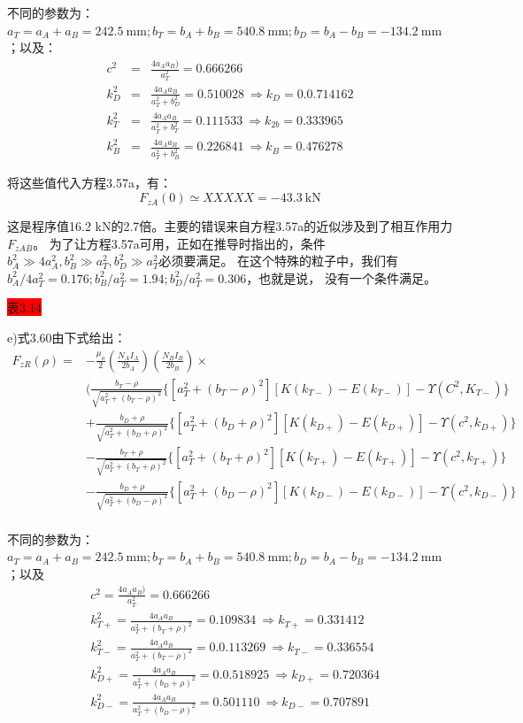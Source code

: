 不同的参数为：$a_T=a_A+a_B=242.5 \ \mathrm{mm};b_T=b_A+b_B=540.8 \ \mathrm{mm}; b_D=b_A−b_B=−134.2 \ \mathrm{mm}$；以及：
\begin{eqnarray*}
c^2&=&\frac{4a_A a_B)}{a_T^2}=0.666266\\
k_D^2&=&\frac{4a_A a_B}{a_T^2+b_D^2}=0.510028\ \Rightarrow k_D=0.0.714162\\
k_{T}^2&=&\frac{4a_A a_B}{a_T^2+b_T^2}=0.111533\ \Rightarrow k_{2b}=0.333965\\
k_B^2&=&\frac{4a_A a_B}{a_T^2+b_B^2}=0.226841\ \Rightarrow k_{B}=0.476278
\end{eqnarray*}

将这些值代入方程3.57a，有：
\begin{equation*}
F_{zA}(0)\simeq XXXXX =-43.3\ \mathrm{kN}
\end{equation*}

这是程序值16.2 kN的2.7倍。主要的错误来自方程3.57a的近似涉及到了相互作用力$F_{zAB}$。
为了让方程3.57a可用，正如在推导时指出的，条件$b_A^2\gg  4a_A^2,b^2_B\gg  a_T^2, b_D^2\gg a_T^2$必须要满足。
在这个特殊的粒子中，我们有$b_A^2/4a_T^2=0.176;b^2_B/a_T^2 = 1.94; b_D^2/a_T^2 = 0.306$，也就是说，
没有一个条件满足。

\colorbox{red}{表3.14}

e)式3.60由下式给出：
\begin{equation*}
\begin{split}
F_{zR}(\rho)=&-\frac{\mu_{o}}{2}(\frac{N_{A}I_{A}}{2b_{A}})(\frac{N_{B}I_{B}}{2b_{B}})\times\\
&(\frac{b_{T}-\rho}{\sqrt{a_{T}^{2}+(b_{T}-\rho)^{2}}}\{[a_{T}^{2}+(b_{T}-\rho)^{2}][K(k_{T-})-E(k_{T-})]-\Upsilon(C^{2},K_{T-})\}\\
&+\frac{b_{D}+\rho}{\sqrt{a_{T}^{2}+(b_{D}+\rho)^{2}}}\{[a_{T}^{2}+(b_{D}+\rho)^{2}][K(k_{D+})-E(k_{D+})]-\Upsilon(c^{2},k_{D+})\}\\
&-\frac{b_{T}+\rho}{\sqrt{a_{T}^{2}+(b_{T}+\rho)^{2}}}\{[a_{T}^{2}+(b_{T}+\rho)^{2}][K(k_{T+})-E(k_{T+})]-\Upsilon(c^{2},k_{T+})\}\\
&-\frac{b_{D}+\rho}{\sqrt{a_{T}^{2}+(b_{D}-\rho)^{2}}}\{[a_{T}^{2}+(b_{D}-\rho)^{2}][K(k_{D-})-E(k_{D-})]-\Upsilon(c^{2},k_{D-})\}\\%
\end{split}\tag{3.60}
\end{equation*}

不同的参数为：$a_T=a_A+a_B=242.5 \ \mathrm{mm};b_T=b_A+b_B=540.8 \ \mathrm{mm}; b_D=b_A−b_B=−134.2 \ \mathrm{mm}$；以及
\begin{eqnarray*}
&c^2=\frac{4a_A a_B)}{a_T^2}=0.666266\\
&k_{T+}^2=\frac{4a_A a_B}{a_T^2+(b_T+\rho)^2}=0.109834\ \Rightarrow k_{T+}=0.331412\\
&k_{T-}^2=\frac{4a_A a_B}{a_T^2+(b_T-\rho)^2}=0.0.113269\ \Rightarrow k_{T-}=0.336554\\
&k_{D+}^2=\frac{4a_A a_B}{a_T^2+(b_D+\rho)^2}=0.0.518925\ \Rightarrow k_{D+}=0.720364\\
&k_{D-}^2=\frac{4a_A a_B}{a_T^2+(b_D-\rho)^2}=0.501110\ \Rightarrow k_{D-}=0.707891
\end{eqnarray*}

